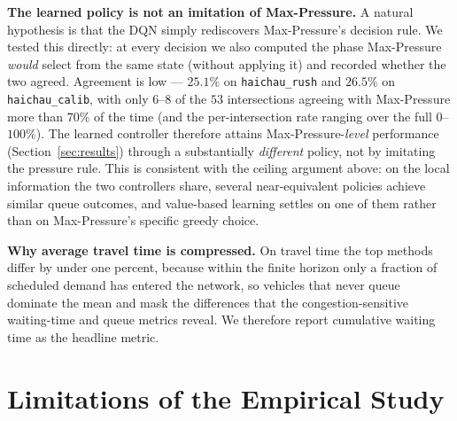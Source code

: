 \textbf{The learned policy is not an imitation of Max-Pressure.} A natural hypothesis is that the
DQN simply rediscovers Max-Pressure's decision rule. We tested this directly: at every decision we
also computed the phase Max-Pressure \emph{would} select from the same state (without applying it)
and recorded whether the two agreed. Agreement is low --- $25.1\%$ on \texttt{haichau\_rush} and
$26.5\%$ on \texttt{haichau\_calib}, with only $6$--$8$ of the $53$ intersections agreeing with
Max-Pressure more than $70\%$ of the time (and the per-intersection rate ranging over the full
$0$--$100\%$). The learned controller therefore attains Max-Pressure-\emph{level} performance
(Section~\ref{sec:results}) through a substantially \emph{different} policy, not by imitating the
pressure rule. This is consistent with the ceiling argument above: on the local information the two
controllers share, several near-equivalent policies achieve similar queue outcomes, and value-based
learning settles on one of them rather than on Max-Pressure's specific greedy choice.

\textbf{Why average travel time is compressed.} On travel time the top methods differ by
under one percent, because within the finite horizon only a fraction of scheduled demand
has entered the network, so vehicles that never queue dominate the mean and mask the
differences that the congestion-sensitive waiting-time and queue metrics reveal. We
therefore report cumulative waiting time as the headline metric.

\section{Limitations of the Empirical Study}
\label{sec:limits}

